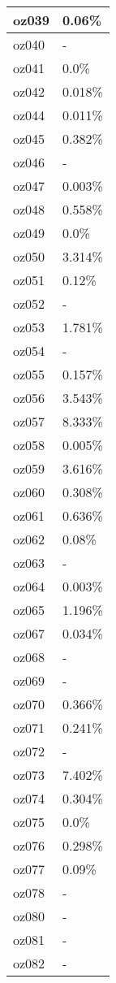 \documentclass{article}%
\begin{document}
\begin{longtabu}{X[l] X[r]}
\hline%
oz039&0.06\%\\%
\hline%
oz040&{-}\\%
\hline%
oz041&0.0\%\\%
\hline%
oz042&0.018\%\\%
\hline%
oz044&0.011\%\\%
\hline%
oz045&0.382\%\\%
\hline%
oz046&{-}\\%
\hline%
oz047&0.003\%\\%
\hline%
oz048&0.558\%\\%
\hline%
oz049&0.0\%\\%
\hline%
oz050&3.314\%\\%
\hline%
oz051&0.12\%\\%
\hline%
oz052&{-}\\%
\hline%
oz053&1.781\%\\%
\hline%
oz054&{-}\\%
\hline%
oz055&0.157\%\\%
\hline%
oz056&3.543\%\\%
\hline%
oz057&8.333\%\\%
\hline%
oz058&0.005\%\\%
\hline%
oz059&3.616\%\\%
\hline%
oz060&0.308\%\\%
\hline%
oz061&0.636\%\\%
\hline%
oz062&0.08\%\\%
\hline%
oz063&{-}\\%
\hline%
oz064&0.003\%\\%
\hline%
oz065&1.196\%\\%
\hline%
oz067&0.034\%\\%
\hline%
oz068&{-}\\%
\hline%
oz069&{-}\\%
\hline%
oz070&0.366\%\\%
\hline%
oz071&0.241\%\\%
\hline%
oz072&{-}\\%
\hline%
oz073&7.402\%\\%
\hline%
oz074&0.304\%\\%
\hline%
oz075&0.0\%\\%
\hline%
oz076&0.298\%\\%
\hline%
oz077&0.09\%\\%
\hline%
oz078&{-}\\%
\hline%
oz080&{-}\\%
\hline%
oz081&{-}\\%
\hline%
oz082&{-}\\%

\end{longtabu}
\end{document}
